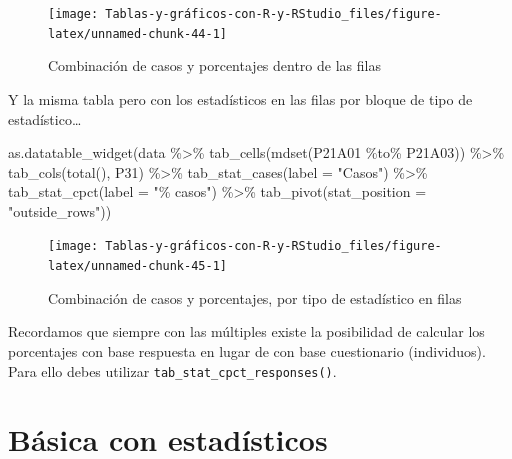 \documentclass[
]{book}
\newenvironment{Shaded}{\begin{snugshade}}{\end{snugshade}}
\newcommand{\AttributeTok}[1]{\textcolor[rgb]{0.77,0.63,0.00}{#1}}
\newcommand{\FunctionTok}[1]{\textcolor[rgb]{0.00,0.00,0.00}{#1}}
\newcommand{\NormalTok}[1]{#1}
\newcommand{\SpecialCharTok}[1]{\textcolor[rgb]{0.00,0.00,0.00}{#1}}
\newcommand{\StringTok}[1]{\textcolor[rgb]{0.31,0.60,0.02}{#1}}
\begin{document}
\begin{figure}[H]

{\centering \texttt{[image: Tablas-y-gráficos-con-R-y-RStudio\_files/figure-latex/unnamed-chunk-44-1]} 

}

\caption{Combinación de casos y porcentajes dentro de las filas}\label{fig:unnamed-chunk-44}
\end{figure}

Y la misma tabla pero con los estadísticos en las filas por bloque de tipo de estadístico\ldots{}

\begin{Shaded}
\begin{Highlighting}[]
\FunctionTok{as.datatable\_widget}\NormalTok{(data }\SpecialCharTok{\%\textgreater{}\%} \FunctionTok{tab\_cells}\NormalTok{(}\FunctionTok{mdset}\NormalTok{(P21A01 }\SpecialCharTok{\%to\%} 
\NormalTok{  P21A03)) }\SpecialCharTok{\%\textgreater{}\%} \FunctionTok{tab\_cols}\NormalTok{(}\FunctionTok{total}\NormalTok{(), P31) }\SpecialCharTok{\%\textgreater{}\%} \FunctionTok{tab\_stat\_cases}\NormalTok{(}\AttributeTok{label =} \StringTok{"Casos"}\NormalTok{) }\SpecialCharTok{\%\textgreater{}\%} 
  \FunctionTok{tab\_stat\_cpct}\NormalTok{(}\AttributeTok{label =} \StringTok{"\% casos"}\NormalTok{) }\SpecialCharTok{\%\textgreater{}\%} \FunctionTok{tab\_pivot}\NormalTok{(}\AttributeTok{stat\_position =} \StringTok{"outside\_rows"}\NormalTok{))}
\end{Highlighting}
\end{Shaded}

\begin{figure}[H]

{\centering \texttt{[image: Tablas-y-gráficos-con-R-y-RStudio\_files/figure-latex/unnamed-chunk-45-1]} 

}

\caption{Combinación de casos y porcentajes, por tipo de estadístico en filas}\label{fig:unnamed-chunk-45}
\end{figure}

Recordamos que siempre con las múltiples existe la posibilidad de calcular los porcentajes con base respuesta en lugar de con base cuestionario (individuos). Para ello debes utilizar \texttt{tab\_stat\_cpct\_responses()}.

\hypertarget{buxe1sica-con-estaduxedsticos}{%
\section{Básica con estadísticos}\label{buxe1sica-con-estaduxedsticos}}
\end{document}
